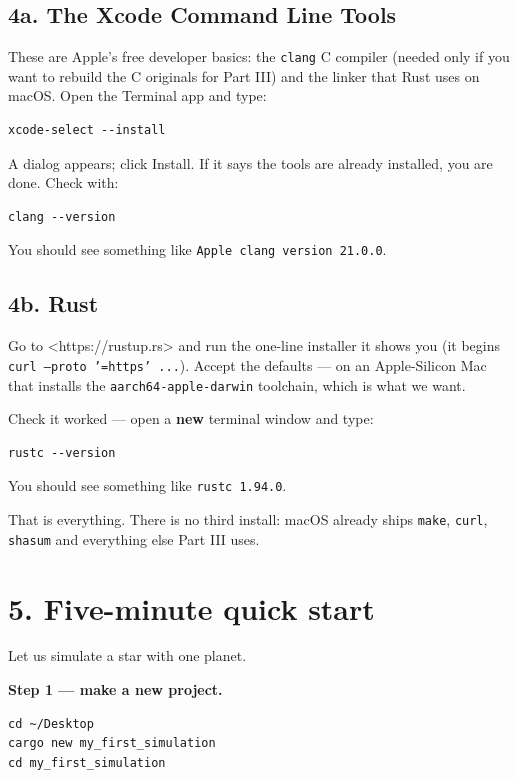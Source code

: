 \documentclass[11pt]{article}
\begin{document}
\subsection{4a. The Xcode Command Line Tools}

These are Apple's free developer basics: the \texttt{clang} C compiler (needed only if you want to rebuild the C originals for Part III) and the linker that Rust uses on macOS. Open the Terminal app and type:

\begin{lstlisting}
xcode-select --install
\end{lstlisting}

A dialog appears; click Install. If it says the tools are already installed, you are done. Check with:

\begin{lstlisting}
clang --version
\end{lstlisting}

You should see something like \texttt{Apple clang version 21.0.0}.

\subsection{4b. Rust}

Go to <https://rustup.rs> and run the one-line installer it shows you (it begins \texttt{curl --proto '=https' ...}). Accept the defaults --- on an Apple-Silicon Mac that installs the \texttt{aarch64-apple-darwin} toolchain, which is what we want.

Check it worked --- open a \textbf{new} terminal window and type:

\begin{lstlisting}
rustc --version
\end{lstlisting}

You should see something like \texttt{rustc 1.94.0}.

That is everything. There is no third install: macOS already ships \texttt{make}, \texttt{curl}, \texttt{shasum} and everything else Part III uses.

\section{5. Five-minute quick start}

Let us simulate a star with one planet.

\textbf{Step 1 --- make a new project.}

\begin{lstlisting}
cd ~/Desktop
cargo new my_first_simulation
cd my_first_simulation
\end{lstlisting}
\end{document}
